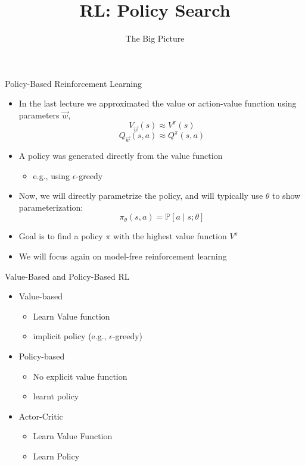 \documentclass[aspectratio=169]{../latex_main/tntbeamer}  %
\title[RL: Big Picture]{RL: Policy Search}
\subtitle{The Big Picture}
\begin{document}
	
	\maketitle

\begin{frame}[c]{Policy-Based Reinforcement Learning}

\begin{itemize}
	\item In the last lecture we approximated the value or action-value function
	using parameters $\vec{w}$,
	$$V_{\vec{w}}(s) \approx V^\pi(s)$$
	$$Q_{\vec{w}}(s,a) \approx Q^\pi (s,a) $$
	\item A policy was generated directly from the value function
	\begin{itemize}
		\item e.g., using $\epsilon$-greedy
	\end{itemize}	
	\item Now, we will directly parametrize the policy, and will typically
	use $\theta$ to show parameterization:
	$$\pi_\theta (s,a) = \mathbb{P}[ a\mid s; \theta] $$
	\item Goal is to find a policy $\pi$ with the highest value function $V^\pi$
	\item We will focus again on model-free reinforcement learning
\end{itemize}

\end{frame}
\begin{frame}[c]{Value-Based and Policy-Based RL}

	\begin{itemize}
		\item Value-based
		\begin{itemize}
			\item Learn Value function
			\item implicit policy (e.g., $\epsilon$-greedy)
		\end{itemize}
		\item Policy-based
		\begin{itemize}
			\item No explicit value function
			\item learnt policy
		\end{itemize}
		\item Actor-Critic
		\begin{itemize}
			\item Learn Value Function
			\item Learn Policy
		\end{itemize}
		
	\end{itemize}		
	
\end{frame}
\end{document}
